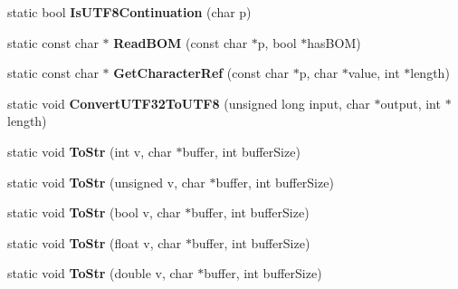 \begin{DoxyCompactItemize}
static bool {\bfseries Is\+U\+T\+F8\+Continuation} (char p)
\item 
\mbox{\label{classCPlantBox_1_1tinyxml2_1_1XMLUtil_a5aee0e8ccdd952523cb93635d466deed}} 
static const char $\ast$ {\bfseries Read\+B\+OM} (const char $\ast$p, bool $\ast$has\+B\+OM)
\item 
\mbox{\label{classCPlantBox_1_1tinyxml2_1_1XMLUtil_a8a148461aaca00bbbd743dcbacbb177c}} 
static const char $\ast$ {\bfseries Get\+Character\+Ref} (const char $\ast$p, char $\ast$value, int $\ast$length)
\item 
\mbox{\label{classCPlantBox_1_1tinyxml2_1_1XMLUtil_a994db629f355b2ecd387e44b117c6ccb}} 
static void {\bfseries Convert\+U\+T\+F32\+To\+U\+T\+F8} (unsigned long input, char $\ast$output, int $\ast$length)
\item 
\mbox{\label{classCPlantBox_1_1tinyxml2_1_1XMLUtil_a1f3e01ff2c683f6d8748125689b2331e}} 
static void {\bfseries To\+Str} (int v, char $\ast$buffer, int buffer\+Size)
\item 
\mbox{\label{classCPlantBox_1_1tinyxml2_1_1XMLUtil_ac6de2f5e7e5e96649560a2dfa8bc00a8}} 
static void {\bfseries To\+Str} (unsigned v, char $\ast$buffer, int buffer\+Size)
\item 
\mbox{\label{classCPlantBox_1_1tinyxml2_1_1XMLUtil_a06e8561a853eab44b5233d4215044bc3}} 
static void {\bfseries To\+Str} (bool v, char $\ast$buffer, int buffer\+Size)
\item 
\mbox{\label{classCPlantBox_1_1tinyxml2_1_1XMLUtil_ac93c43e844e44997a0ad551373ff3560}} 
static void {\bfseries To\+Str} (float v, char $\ast$buffer, int buffer\+Size)
\item 
\mbox{\label{classCPlantBox_1_1tinyxml2_1_1XMLUtil_a594e8b63caf23b0c48cfefc811ce472d}} 
static void {\bfseries To\+Str} (double v, char $\ast$buffer, int buffer\+Size)
\item 
\mbox{\label{classCPlantBox_1_1tinyxml2_1_1XMLUtil_a2f7c8eb5f66dfc9e605c4440264deea4}} 

\end{DoxyCompactItemize}
